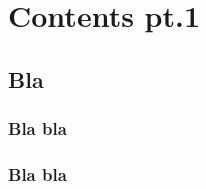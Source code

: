 
    
    \chapter{Contents pt.1}
        
        \minitoc
        \vfill
        \pagebreak
        
        \section{Bla}
        
            \subsection{Bla bla}
                
                \lipsum \cite{author2017, author2018}
                
            
            \subsection{Bla bla}
                
                \lipsum
            
            
        
    
